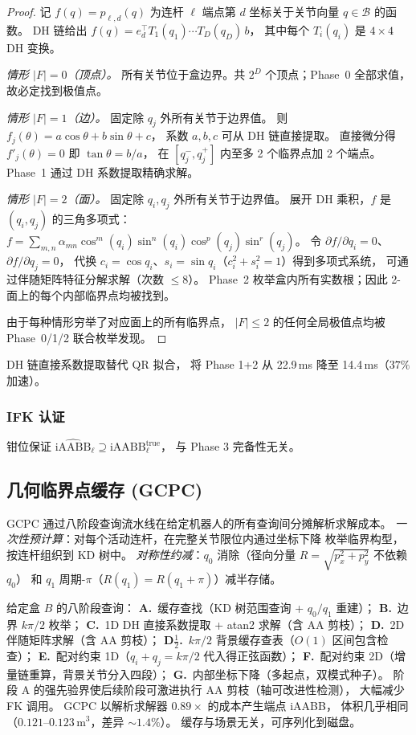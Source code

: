 \documentclass[journal]{IEEEtran}
\newcommand{\iAABB}{\mathrm{iAABB}}
\begin{document}
\begin{proof}
记 $f(q) = p_{\ell,d}(q)$ 为连杆 $\ell$ 端点第 $d$ 坐标关于关节向量
$q \in \mathcal{B}$ 的函数。
DH 链给出 $f(q) = e_d^\top T_1(q_1) \cdots T_D(q_D)\,b$，
其中每个 $T_i(q_i)$ 是 $4{\times}4$ DH 变换。

\emph{情形 $|F|=0$（顶点）。}
所有关节位于盒边界。共 $2^D$ 个顶点；Phase~0 全部求值，故必定找到极值点。

\emph{情形 $|F|=1$（边）。}
固定除 $q_j$ 外所有关节于边界值。
则 $f_j(\theta) = a\cos\theta + b\sin\theta + c$，
系数 $a, b, c$ 可从 DH 链直接提取。
直接微分得 $f'_j(\theta) = 0$ 即 $\tan\theta = b/a$，
在 $[q_j^-, q_j^+]$ 内至多 2 个临界点加 2 个端点。
Phase~1 通过 DH 系数提取精确求解。

\emph{情形 $|F|=2$（面）。}
固定除 $q_i, q_j$ 外所有关节于边界值。
展开 DH 乘积，$f$ 是 $(q_i, q_j)$ 的三角多项式：
$f = \sum_{m,n} \alpha_{mn} \cos^m(q_i)\sin^n(q_i) \cos^p(q_j) \sin^r(q_j)$。
令 $\partial f/\partial q_i = 0$、
$\partial f/\partial q_j = 0$，
代换 $c_i = \cos q_i$、$s_i = \sin q_i$（$c_i^2 + s_i^2 = 1$）得到多项式系统，
可通过伴随矩阵特征分解求解（次数 $\leq 8$）。
Phase~2 枚举盒内所有实数根；因此 2-面上的每个内部临界点均被找到。

由于每种情形穷举了对应面上的所有临界点，
$|F| \leq 2$ 的任何全局极值点均被 Phase~0/1/2 联合枚举发现。
\end{proof}

DH 链直接系数提取替代 QR 拟合，
将 Phase 1+2 从 22.9\,ms 降至 14.4\,ms（$37\%$ 加速）。

\subsubsection{IFK 认证}
钳位保证
$\widehat{\iAABB}_\ell \supseteq \iAABB^{\mathrm{true}}_\ell$，
与 Phase 3 完备性无关。

\subsection{几何临界点缓存 (GCPC)}\label{sec:gcpc}

GCPC 通过八阶段查询流水线在给定机器人的所有查询间分摊解析求解成本。
\emph{一次性预计算}：对每个活动连杆，在完整关节限位内通过坐标下降
枚举临界构型，按连杆组织到 KD 树中。
\emph{对称性约减}：$q_0$ 消除（径向分量 $R = \sqrt{p_x^2 + p_y^2}$ 不依赖 $q_0$）
和 $q_1$ 周期-$\pi$（$R(q_1) = R(q_1 + \pi)$）减半存储。

给定盒 $B$ 的八阶段查询：
\textbf{A.}~缓存查找（KD 树范围查询 + $q_0/q_1$ 重建）；
\textbf{B.}~边界 $k\pi/2$ 枚举；
\textbf{C.}~1D DH 直接系数提取 + atan2 求解（含 AA 剪枝）；
\textbf{D.}~2D 伴随矩阵求解（含 AA 剪枝）；
\textbf{D$\frac{1}{2}$.}~$k\pi/2$ 背景缓存查表（$O(1)$ 区间包含检查）；
\textbf{E.}~配对约束 1D（$q_i + q_j = k\pi/2$ 代入得正弦函数）；
\textbf{F.}~配对约束 2D（增量链重算，背景关节分入四段）；
\textbf{G.}~内部坐标下降（多起点，双模式种子）。
阶段 A 的强先验界使后续阶段可激进执行 AA 剪枝（轴可改进性检测），
大幅减少 FK 调用。
GCPC 以解析求解器 $0.89{\times}$ 的成本产生端点 iAABB，
体积几乎相同（$0.121$--$0.123\,$m$^3$，差异 $\sim 1.4\%$）。
缓存与场景无关，可序列化到磁盘。
\end{document}
